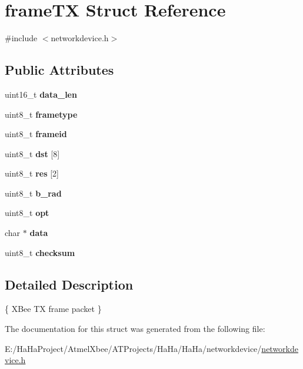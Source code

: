 \hypertarget{structframe_t_x}{}\section{frame\+TX Struct Reference}
\label{structframe_t_x}


{\ttfamily \#include $<$networkdevice.\+h$>$}

\subsection*{Public Attributes}
\begin{DoxyCompactItemize}
\item 
\mbox{\label{structframe_t_x_ae97c6c32cae2233e9a532f3f18acb87a}} 
uint16\+\_\+t {\bfseries data\+\_\+len}
\item 
\mbox{\label{structframe_t_x_ae0184264e132f9acfedd9d73e067d749}} 
uint8\+\_\+t {\bfseries frametype}
\item 
\mbox{\label{structframe_t_x_a81728989f69fb448c3107efe57d9acee}} 
uint8\+\_\+t {\bfseries frameid}
\item 
\mbox{\label{structframe_t_x_ac6af0f89587bfdd91eabbc1664ed0b18}} 
uint8\+\_\+t {\bfseries dst} \mbox{[}8\mbox{]}
\item 
\mbox{\label{structframe_t_x_aaa8e3f6c37ba7164586ece2aa05d02d1}} 
uint8\+\_\+t {\bfseries res} \mbox{[}2\mbox{]}
\item 
\mbox{\label{structframe_t_x_a9902ea07b8e5fc897038c4a78c052d46}} 
uint8\+\_\+t {\bfseries b\+\_\+rad}
\item 
\mbox{\label{structframe_t_x_a683e80dc13eeb1ab084dcc79deea00a1}} 
uint8\+\_\+t {\bfseries opt}
\item 
\mbox{\label{structframe_t_x_a03427b6b3acbd35f51927438a3366cb5}} 
char $\ast$ {\bfseries data}
\item 
\mbox{\label{structframe_t_x_ac11d9bcebc8ed64242ac82e05b1bcf43}} 
uint8\+\_\+t {\bfseries checksum}
\end{DoxyCompactItemize}


\subsection{Detailed Description}
\{ X\+Bee TX frame packet \} 

The documentation for this struct was generated from the following file\+:\begin{DoxyCompactItemize}
\item 
E\+:/\+Ha\+Ha\+Project/\+Atmel\+Xbee/\+A\+T\+Projects/\+Ha\+Ha/\+Ha\+Ha/networkdevice/\hyperlink{networkdevice_8h}{networkdevice.\+h}\end{DoxyCompactItemize}
